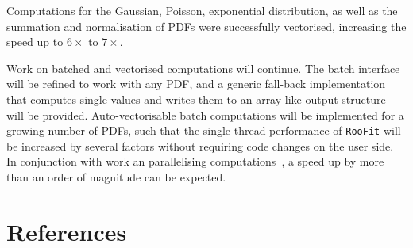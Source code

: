 \documentclass[a4paper]{jpconf}
\newcommand{\RooFit}{\texttt{RooFit}\xspace}
\begin{document}
Computations for the Gaussian, Poisson, exponential distribution, as well as the summation and normalisation of PDFs were successfully
vectorised, increasing the speed up to $6{\times}$ to $7{\times}$.

\bigskip
Work on batched and vectorised computations will continue. The batch interface will be refined to work with any PDF, and a generic
fall-back implementation that computes single values and writes them to an array-like output structure will be provided. Auto-vectorisable batch computations will be implemented for a growing number of PDFs, such that the
single-thread performance of \RooFit will be increased by several factors without requiring code changes on the user side.
In conjunction with work an parallelising computations~\cite{Patrick}, a speed up by more than an order of magnitude can be expected.

\section*{References}

\end{document}
